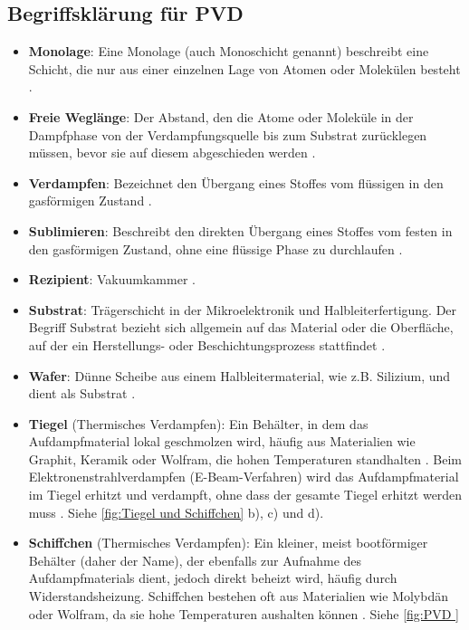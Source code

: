 \documentclass{article} %
\begin{document}
\subsection{Begriffsklärung für PVD} %
\begin{itemize}
    \item \textbf{Monolage}: Eine Monolage (auch Monoschicht genannt) beschreibt eine Schicht, die nur aus einer einzelnen Lage von Atomen oder 
    Molekülen besteht \cite{kittel2004}.
    \item \textbf{Freie Weglänge}: Der Abstand, den die Atome oder Moleküle in der Dampfphase von der Verdampfungsquelle bis zum Substrat 
    zurücklegen müssen, bevor sie auf diesem abgeschieden werden \cite{kittel2004}.
    \item \textbf{Verdampfen}: Bezeichnet den Übergang eines Stoffes vom flüssigen in den gasförmigen Zustand \cite{kittel2004}.
    \item \textbf{Sublimieren}: Beschreibt den direkten Übergang eines Stoffes vom festen in den gasförmigen Zustand, ohne eine flüssige Phase 
    zu durchlaufen \cite{kittel2004}.
    \item \textbf{Rezipient}: Vakuumkammer \cite{keplinger2024, ohring2002}.
    \item \textbf{Substrat}: Trägerschicht in der Mikroelektronik und Halbleiterfertigung. Der Begriff Substrat bezieht sich allgemein auf das 
    Material oder die Oberfläche, auf der ein Herstellungs- oder Beschichtungsprozess stattfindet \cite{ohring2002}.
    \item \textbf{Wafer}: Dünne Scheibe aus einem Halbleitermaterial, wie z.B. Silizium, und dient als Substrat \cite{sze2006}.
    \item \textbf{Tiegel} (Thermisches Verdampfen): Ein Behälter, in dem das Aufdampfmaterial lokal geschmolzen wird, häufig aus Materialien wie Graphit, 
    Keramik oder Wolfram, die hohen Temperaturen standhalten \cite{smith1995, ohring2002}. Beim Elektronenstrahlverdampfen (E-Beam-Verfahren) wird das 
    Aufdampfmaterial im Tiegel erhitzt und verdampft, ohne dass der gesamte Tiegel erhitzt werden muss \cite{smith1995}. Siehe
    \autoref{fig:Tiegel und Schiffchen} b), c) und d).
    \item \textbf{Schiffchen} (Thermisches Verdampfen): Ein kleiner, meist bootförmiger Behälter (daher der Name), der 
    ebenfalls zur Aufnahme des Aufdampfmaterials dient, jedoch direkt beheizt wird, häufig durch Widerstandsheizung. Schiffchen bestehen oft aus 
    Materialien wie Molybdän oder Wolfram, da sie hohe Temperaturen aushalten können \cite{mattox2010handbook, ohring2002}. Siehe \autoref{fig:PVD 
}
\end{itemize}
\end{document}
